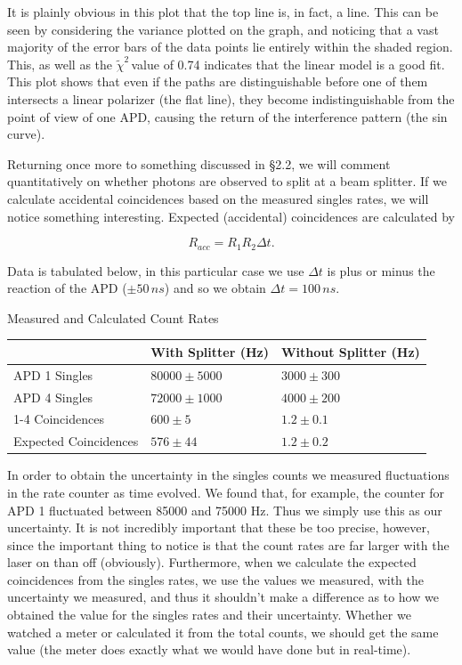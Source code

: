 \documentclass{article}
\newcommand{\redchi}{$\tilde{\chi}^2\,$}
\begin{document}
It is plainly obvious in this plot that the top line is, in fact, a line.  This can be seen by considering the variance plotted on the graph, and noticing that a vast majority of the error bars of the data points lie entirely within the shaded region.  This, as well as the \redchi value of 0.74 indicates that the linear model is a good fit.  This plot shows that even if the paths are distinguishable before one of them intersects a linear polarizer (the flat line), they become indistinguishable from the point of view of one APD, causing the return of the interference pattern (the sin curve).

\hspace{.25cm}

Returning once more to something discussed in \S 2.2, we will comment quantitatively on whether photons are observed to split at a beam splitter.  If we calculate accidental coincidences based on the measured singles rates, we will notice something interesting.  Expected (accidental) coincidences are calculated by

\begin{equation}
	R_{acc} = R_1R_2\Delta t.
\end{equation}

Data is tabulated below, in this particular case we use $\Delta t$ is plus or minus the reaction of the APD ($\pm 50 \, ns$) and so we obtain $\Delta t = 100 \, ns$.

\begin{center}
Measured and Calculated Count Rates\\
\begin{tabular}{|l|l|l|}
	\hline
	 & With Splitter (Hz) & Without Splitter (Hz) \\ 
	\hline
	APD 1 Singles & $80000 \pm 5000$ & $3000 \pm 300$ \\
	APD 4 Singles & $72000 \pm 1000$ & $4000 \pm 200$ \\
	1-4 Coincidences & $600 \pm 5$ & $1.2 \pm 0.1$ \\
	Expected Coincidences & $576 \pm 44$ & $1.2 \pm 0.2$ \\
	\hline
\end{tabular}
\end{center}

In order to obtain the uncertainty in the singles counts we measured fluctuations in the rate counter as time evolved.  We found that, for example, the counter for APD 1 fluctuated between 85000 and 75000 Hz.  Thus we simply use this as our uncertainty.  It is not incredibly important that these be too precise, however, since the important thing to notice is that the count rates are far larger with the laser on than off (obviously).  Furthermore, when we calculate the expected coincidences from the singles rates, we use the values we measured, with the uncertainty we measured, and thus it shouldn't make a difference as to how we obtained the value for the singles rates and their uncertainty.  Whether we watched a meter or calculated it from the total counts, we should get the same value (the meter does exactly what we would have done but in real-time).
\end{document}
